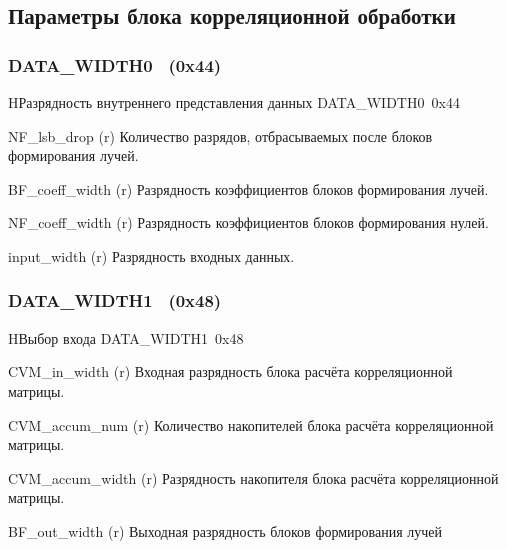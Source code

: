\subsection{Параметры блока корреляционной обработки}

\subsubsection{DATA\_WIDTH0~ (0x44)}
\renewcommand{\regnam}{DATA\_WIDTH0~}
\label{sec:DATA_WIDTH0}

\begin{register}{H}{Разрядность внутреннего представления данных \regnam}{0x44}

\label{regsamplecount}%
%
%
%
%
\regnewline%

\begin{regdesc}\begin{reglist}
\item [NF\_lsb\_drop (r)]
Количество разрядов, отбрасываемых после блоков формирования лучей.
\item [BF\_coeff\_width (r)]
Разрядность коэффициентов блоков формирования лучей.
\item [NF\_coeff\_width (r)]
Разрядность коэффициентов блоков формирования нулей.
\item [input\_width (r)]
Разрядность входных данных.
\end{reglist}\end{regdesc}
\end{register}

\subsubsection{DATA\_WIDTH1~ (0x48)}
\renewcommand{\regnam}{DATA\_WIDTH1~}
\label{sec:DATA_WIDTH1}

\begin{register}{H}{Выбор входа \regnam}{0x48}

\label{regsamplecount}%
%
%
%
%
\regnewline%

\begin{regdesc}\begin{reglist}
\item [CVM\_in\_width (r)]
Входная разрядность блока расчёта корреляционной матрицы.
\item [CVM\_accum\_num (r)]
Количество накопителей блока расчёта корреляционной матрицы.
\item [CVM\_accum\_width (r)]
Разрядность накопителя блока расчёта корреляционной матрицы.
\item [BF\_out\_width (r)]
Выходная разрядность блоков формирования лучей
\end{reglist}\end{regdesc}
\end{register}

